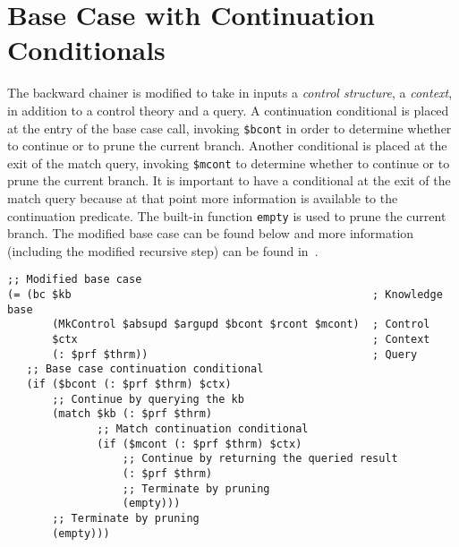 \documentclass{easychair}
\begin{document}
\section{Base Case with Continuation Conditionals}
\label{app:backward-chainer-continuation-conditionals}

The backward chainer is modified to take in inputs a \emph{control
structure}, a \emph{context}, in addition to a control theory and a
query.  A continuation conditional is placed at the entry of the base
case call, invoking \texttt{\$bcont} in order to determine whether to
continue or to prune the current branch.  Another conditional is
placed at the exit of the match query, invoking \texttt{\$mcont} to
determine whether to continue or to prune the current branch.  It is
important to have a conditional at the exit of the match query because
at that point more information is available to the continuation
predicate.  The built-in function \texttt{empty} is used to prune the
current branch.  The modified base case can be found below and more
information (including the modified recursive step) can be found
in~\cite{Geisweiller2024ICM}.  \small{
\begin{verbatim}
;; Modified base case
(= (bc $kb                                               ; Knowledge base
       (MkControl $absupd $argupd $bcont $rcont $mcont)  ; Control
       $ctx                                              ; Context
       (: $prf $thrm))                                   ; Query
   ;; Base case continuation conditional
   (if ($bcont (: $prf $thrm) $ctx)
       ;; Continue by querying the kb
       (match $kb (: $prf $thrm)
              ;; Match continuation conditional
              (if ($mcont (: $prf $thrm) $ctx)
                  ;; Continue by returning the queried result
                  (: $prf $thrm)
                  ;; Terminate by pruning
                  (empty)))
       ;; Terminate by pruning
       (empty)))
\end{verbatim}
}

\end{document}
